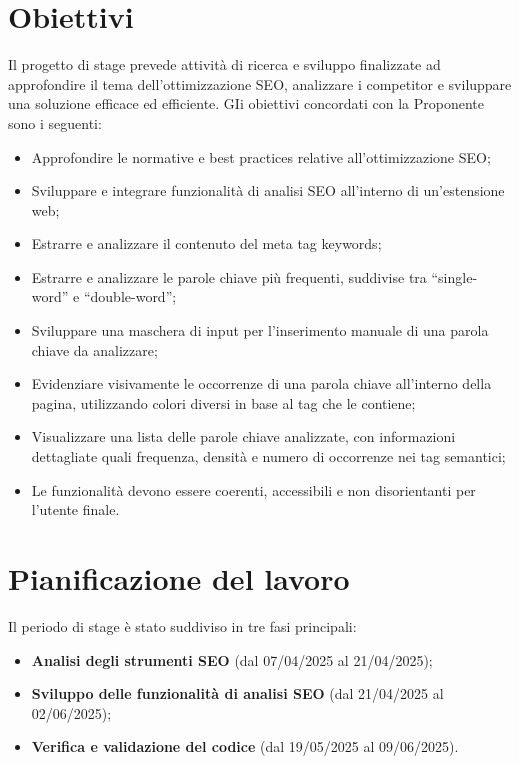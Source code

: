 \section{Obiettivi}
\label{sec:obiettivi}

\par Il progetto di stage prevede attività di ricerca e sviluppo finalizzate ad approfondire il tema dell’ottimizzazione SEO, analizzare i competitor e sviluppare una soluzione efficace ed efficiente. GIi obiettivi concordati con la Proponente sono i seguenti:

\begin{itemize}
  \item Approfondire le normative e best practices relative all’ottimizzazione SEO;
  \item Sviluppare e integrare funzionalità di analisi SEO all’interno di un’estensione web;
  \item Estrarre e analizzare il contenuto del meta tag keywords;
  \item Estrarre e analizzare le parole chiave più frequenti, suddivise tra “single-word” e “double-word”;
  \item Sviluppare una maschera di input per l’inserimento manuale di una parola chiave da analizzare;
  \item Evidenziare visivamente le occorrenze di una parola chiave all’interno della pagina, utilizzando colori diversi in base al tag che le contiene;
  \item Visualizzare una lista delle parole chiave analizzate, con informazioni dettagliate quali frequenza, densità e numero di occorrenze nei tag semantici;
  \item Le funzionalità devono essere coerenti, accessibili e non disorientanti per l’utente finale.
\end{itemize}

\section{Pianificazione del lavoro}
\label{sec:pianificazione}

\par Il periodo di stage è stato suddiviso in tre fasi principali:
\begin{itemize}
  \item \textbf{Analisi degli strumenti SEO} (dal 07/04/2025 al 21/04/2025);
  \item \textbf{Sviluppo delle funzionalità di analisi SEO} (dal 21/04/2025 al 02/06/2025);
  \item \textbf{Verifica e validazione del codice} (dal 19/05/2025 al 09/06/2025).
\end{itemize}

